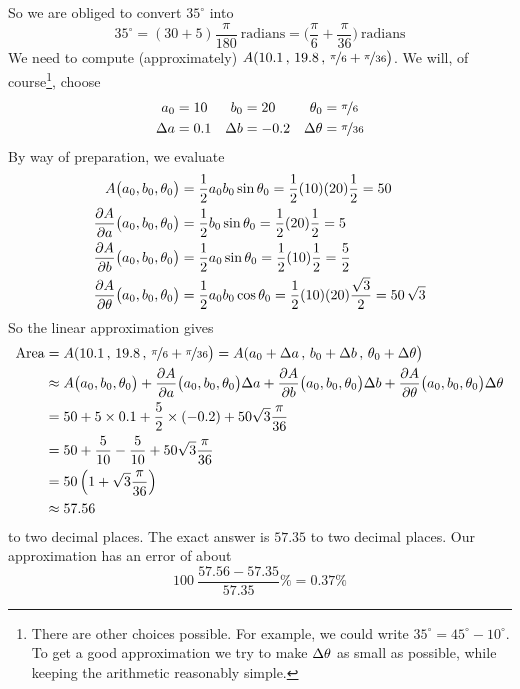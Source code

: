 \begin{eg}
So we are obliged to convert $35^\circ$ into
\begin{equation*}
35^\circ = (30+5) \frac{\pi}{180}\ \text{radians}
         =\Big(\frac{\pi}{6} + \frac{\pi}{36}\Big)\ \text{radians}
\end{equation*}
We need to compute (approximately) 
$A(10.1\,,\,19.8\,,\,\nicefrac{\pi}{6}+\nicefrac{\pi}{36}\big)$.
We will, of course\footnote{There are other choices possible.
For example, we could write $35^\circ=45^\circ-10^\circ$. To get a good
approximation we try to make $\Delta\theta$ as small as possible, while 
keeping the arithmetic reasonably simple.}, choose 
\begin{align*}
a_0&=10    &  b_0&=20    & \theta_0&=\nicefrac{\pi}{6} \\
\Delta a&=0.1 & \Delta b&=-0.2 & \Delta\theta&=\nicefrac{\pi}{36}
\end{align*}
By way of preparation, we evaluate
\begin{align*}
A\big(a_0,b_0,\theta_0\big)
&=\frac{1}{2}a_0b_0\sin\theta_0 =\frac{1}{2}(10)(20)\frac{1}{2}=50 \\
\pdiff{A}{a}\big(a_0,b_0,\theta_0\big)
&=\frac{1}{2}b_0\sin\theta_0 =\frac{1}{2}(20)\frac{1}{2} =5 \\
\pdiff{A}{b}\big(a_0,b_0,\theta_0\big)
&=\frac{1}{2}a_0\sin\theta_0 =\frac{1}{2}(10)\frac{1}{2} =\frac{5}{2} \\
\pdiff{A}{\theta}\big(a_0,b_0,\theta_0\big)
&=\frac{1}{2}a_0b_0\cos\theta_0 =\frac{1}{2}(10)(20)\frac{\sqrt{3}}{2} 
 = 50\,\sqrt{3}
\end{align*}
So the linear approximation gives
\begin{align*}
\text{Area} & = A(10.1\,,\,19.8\,,\,\nicefrac{\pi}{6}+\nicefrac{\pi}{36}\big)
              = A(a_0+\De a\,,\,b_0+\De b\,,\,\theta_0+\De\theta\big) \\
&\approx A\big(a_0,b_0,\theta_0\big)
    + \pdiff{A}{a}\big(a_0,b_0,\theta_0\big)\De a
    + \pdiff{A}{b}\big(a_0,b_0,\theta_0\big)\De b
    + \pdiff{A}{\theta}\big(a_0,b_0,\theta_0\big)\De\theta \\
&=50 +5\times 0.1  +\frac{5}{2}\times (-0.2) +50\sqrt{3}\frac{\pi}{36} \\
&=50 +\frac{5}{10}  -\frac{5}{10} +50\sqrt{3}\frac{\pi}{36} \\
&=50\left(1+\sqrt{3}\frac{\pi}{36}\right) \\
&\approx 57.56  %
\end{align*}
to two decimal places. The exact answer is %
$57.35$ to two decimal places. Our
approximation has an error of about
\begin{equation*}
100\ \frac{57.56-57.35}{57.35}\%
=0.37\%
\end{equation*}
\end{eg}

